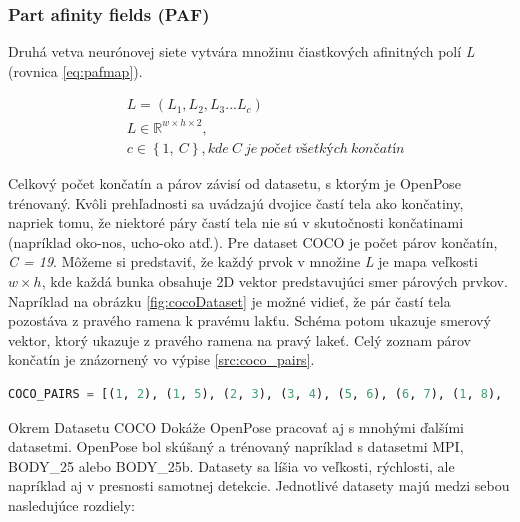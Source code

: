 \documentclass[slovak,master,dept460,male,cpp,cpdeclaration]{diploma}
\begin{document}
\subsubsection{Part afinity fields (PAF)}
Druhá vetva neurónovej siete vytvára množinu čiastkových afinitných polí \textit{L} (rovnica \ref{eq:pafmap}).

\begin{eqnarray}
& L = (L_{1}, L_{2}, L_{3} ... L_{c}) \label{eq:pafmap}\\
& L\in\mathbb{R}^{w \times  h \times 2},\nonumber\\
& c\in \left \{1,\: C  \right \}, kde\: C\: je\: počet\: všetkých\: končatín\nonumber
\end{eqnarray}

Celkový počet končatín a párov závisí od datasetu, s ktorým je OpenPose trénovaný. Kvôli prehľadnosti sa uvádzajú dvojice častí tela ako končatiny, napriek tomu, že niektoré páry častí tela nie sú v skutočnosti končatinami (napríklad oko-nos, ucho-oko atď.). Pre dataset COCO je počet párov končatín, \textit{C = 19}. Môžeme si predstaviť, že každý prvok v množine \textit{L} je mapa veľkosti \textit{$w\times h$}, kde každá bunka obsahuje 2D vektor predstavujúci smer párových prvkov. Napríklad na obrázku \ref{fig:cocoDataset} je možné vidieť, že pár častí tela pozostáva z pravého ramena k pravému lakťu. Schéma potom ukazuje smerový vektor, ktorý ukazuje z pravého ramena na pravý lakeť. Celý zoznam párov končatín je znázornený vo výpise \ref{src:coco_pairs}.\bigskip

\begin{lstlisting}[language=Python,label=src:coco_pairs,caption={Množina párov končatín v datasete COCO}]
COCO_PAIRS = [(1, 2), (1, 5), (2, 3), (3, 4), (5, 6), (6, 7), (1, 8), (8, 9), (9, 10), (1, 11), (11, 12), (12, 13), (1, 0), (0, 14), (14, 16), (0, 15), (15, 17), (2, 16), (5, 17)]
\end{lstlisting}

\bigskip
Okrem Datasetu COCO Dokáže OpenPose pracovať aj s mnohými ďalšími datasetmi. OpenPose bol skúšaný a trénovaný napríklad s datasetmi MPI\cite{andriluka14cvpr}, BODY\_25 alebo BODY\_25b. Datasety sa líšia vo veľkosti, rýchlosti, ale napríklad  aj v presnosti samotnej detekcie. Jednotlivé datasety majú medzi sebou nasledujúce rozdiely:
\end{document}
